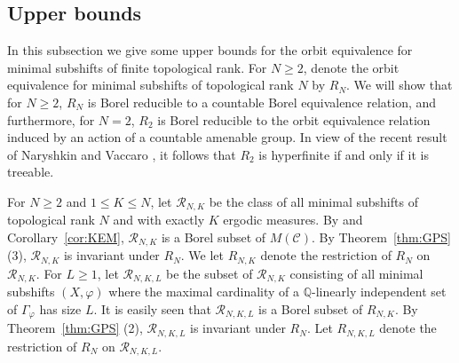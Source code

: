\documentclass{amsart}
\newtheorem{theorem}{Theorem}[section]
\theoremstyle{definition}
\theoremstyle{problem}
\theoremstyle{remark}
\numberwithin{equation}{section}
\begin{document}
\subsection{Upper bounds}
In this subsection we give some upper bounds for the orbit equivalence for minimal subshifts of finite topological rank. For $N\geq 2$, denote the orbit equivalence for minimal subshifts of topological rank $N$ by $R_N$. We will show that for $N\geq 2$, $R_N$ is Borel reducible to a countable Borel equivalence relation, and furthermore, for $N=2$, $R_2$ is Borel reducible to the orbit equivalence relation induced by an action of a countable amenable group. In view of the recent result of Naryshkin and Vaccaro \cite{NV}, it follows that $R_2$ is hyperfinite if and only if it is treeable. 








For $N\geq 2$ and $1\leq K\leq N$, let $\mathcal{R}_{N,K}$ be the class of all minimal subshifts of topological rank $N$ and with exactly $K$ ergodic measures. By \cite[Theorem 3.3]{GL} and Corollary~\ref{cor:KEM}, $\mathcal{R}_{N,K}$ is a Borel subset of $M(\mathcal{C})$. By Theorem~\ref{thm:GPS} (3), $\mathcal{R}_{N,K}$ is invariant under $R_N$.  We let $R_{N,K}$ denote the restriction of $R_N$ on $\mathcal{R}_{N,K}$. For $L\geq 1$, let $\mathcal{R}_{N,K,L}$ be the subset of $\mathcal{R}_{N,K}$ consisting of all minimal subshifts $(X, \varphi)$ where the maximal cardinality of a $\mathbb{Q}$-linearly independent set of $\Gamma_\varphi$ has size $L$. It is easily seen that $\mathcal{R}_{N,K,L}$ is a Borel subset of $R_{N,K}$. By Theorem~\ref{thm:GPS} (2), $\mathcal{R}_{N,K,L}$ is invariant under $R_N$. Let $R_{N,K,L}$ denote the restriction of $R_N$ on $\mathcal{R}_{N,K,L}$.
\end{document}
